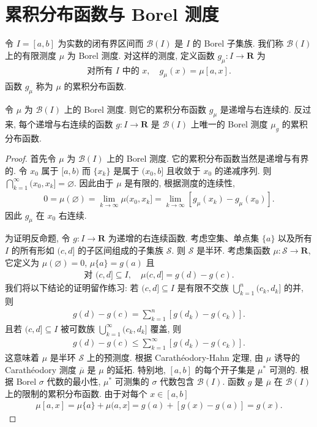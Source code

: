 \documentclass[../../main.tex]{subfiles}
\begin{document}
\section{累积分布函数与 Borel 测度}\label{section:ch20-累积分布}

令 $I=[a,b]$ 为实数的闭有界区间而 $\mathcal{B}(I)$ 是 $I$ 的 Borel 子集族. 我们称 $\mathcal{B}(I)$ 上的有限测度 $\mu$ 为 Borel 测度. 对这样的测度, 定义函数 $g_{\mu}:I\to\mathbf{R}$ 为
\begin{align*}
\text{对所有 }I\text{ 中的 }x,\quad g_{\mu}(x)=\mu[a,x].
\end{align*}
函数 $g_{\mu}$ 称为 $\mu$ 的累积分布函数.

\begin{proposition}\label{proposition:ch20-累积分布对应}
令 $\mu$ 为 $\mathcal{B}(I)$ 上的 Borel 测度. 则它的累积分布函数 $g_{\mu}$ 是递增与右连续的. 反过来, 每个递增与右连续的函数 $g:I\to\mathbf{R}$ 是 $\mathcal{B}(I)$ 上唯一的 Borel 测度 $\mu_{g}$ 的累积分布函数.
\end{proposition}

\begin{proof}
首先令 $\mu$ 为 $\mathcal{B}(I)$ 上的 Borel 测度. 它的累积分布函数当然是递增与有界的. 令 $x_{0}$ 属于 $[a,b)$ 而 $\{x_{k}\}$ 是属于 $(x_{0},b]$ 且收敛于 $x_{0}$ 的递减序列. 则 $\bigcap_{k=1}^{\infty}(x_{0},x_{k}]=\varnothing$. 因此由于 $\mu$ 是有限的, 根据测度的连续性,
\begin{align*}
0=\mu(\varnothing)=\lim_{k\to\infty}\mu(x_{0},x_{k}]=\lim_{k\to\infty}[g_{\mu}(x_{k})-g_{\mu}(x_{0})].
\end{align*}
因此 $g_{\mu}$ 在 $x_{0}$ 右连续.

为证明反命题, 令 $g:I\to\mathbf{R}$ 为递增的右连续函数. 考虑空集、单点集 $\{a\}$ 以及所有 $I$ 的所有形如 $(c,d]$ 的子区间组成的子集族 $\mathcal{S}$. 则 $\mathcal{S}$ 是半环. 考虑集函数 $\mu:\mathcal{S}\to\mathbf{R}$, 它定义为 $\mu(\varnothing)=0$, $\mu\{a\}=g(a)$ 且
\begin{align*}
\text{对 }(c,d]\subseteq I,\quad\mu(c,d]=g(d)-g(c).
\end{align*}
我们将以下结论的证明留作练习: 若 $(c,d]\subseteq I$ 是有限不交族 $\bigcup_{k=1}^{n}(c_{k},d_{k}]$ 的并, 则
\begin{align*}
g(d)-g(c)=\sum_{k=1}^{n}[g(d_{k})-g(c_{k})].
\end{align*}
且若 $(c,d]\subseteq I$ 被可数族 $\bigcup_{k=1}^{\infty}(c_{k},d_{k}]$ 覆盖, 则
\begin{align}\label{align:ch20-预测度不等式}
g(d)-g(c)\leqslant\sum_{k=1}^{\infty}[g(d_{k})-g(c_{k})].
\end{align}
这意味着 $\mu$ 是半环 $\mathcal{S}$ 上的预测度. 根据 Carath\'eodory-Hahn 定理, 由 $\mu$ 诱导的 Carath\'eodory 测度 $\overline{\mu}$ 是 $\mu$ 的延拓. 特别地, $[a,b]$ 的每个开子集是 $\mu^{*}$ 可测的. 根据 Borel $\sigma$ 代数的最小性, $\mu^{*}$ 可测集的 $\sigma$ 代数包含 $\mathcal{B}(I)$. 函数 $g$ 是 $\overline{\mu}$ 在 $\mathcal{B}(I)$ 上的限制的累积分布函数. 由于对每个 $x\in[a,b]$
\begin{align*}
\mu[a,x]=\mu\{a\}+\mu(a,x]=g(a)+[g(x)-g(a)]=g(x).
\end{align*}
\end{proof}
\end{document}
